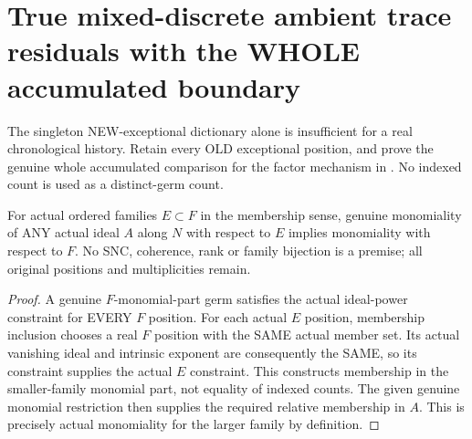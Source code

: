 \section{True mixed-discrete ambient trace residuals with the WHOLE accumulated boundary}

The singleton NEW-exceptional dictionary alone is insufficient for a real
chronological history. Retain every OLD exceptional position, and prove the
genuine whole accumulated comparison for the factor mechanism in
\cite[Remark~12.6, pp.~293--295]{bierstone-milman97-invent-math}.
No indexed count is used as a distinct-germ count.

\begin{lemma}
\label{hir:sharp-actual-monomial-family-inclusion}
\leanok
For actual ordered families $E\subset F$ in the membership sense, genuine
monomiality of ANY actual ideal $A$ along $N$ with respect to $E$ implies
monomiality with respect to $F$. No SNC, coherence, rank or family
bijection is a premise; all original positions and multiplicities remain.
\end{lemma}
\begin{proof}
A genuine $F$-monomial-part germ satisfies the actual ideal-power constraint
for EVERY $F$ position. For each actual $E$ position, membership inclusion
chooses a real $F$ position with the SAME actual member set. Its actual
vanishing ideal and intrinsic exponent are consequently the SAME, so its
constraint supplies the actual $E$ constraint. This constructs membership
in the smaller-family monomial part, not equality of indexed counts.
The given genuine monomial restriction then supplies the required relative
membership in $A$. This is precisely actual monomiality for the larger
family by definition.
\end{proof}

